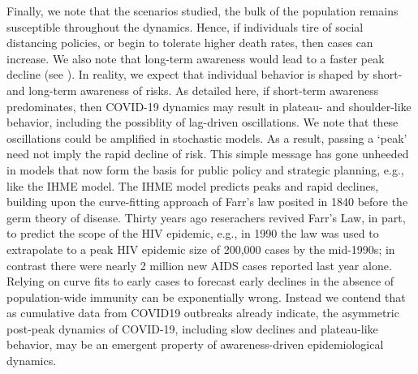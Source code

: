 
Finally, we note that the scenarios studied, the bulk of the population remains
susceptible throughout the dynamics. Hence, if individuals tire of social
distancing policies, or begin to tolerate higher death rates, then cases can
increase. We also note that long-term awareness would lead to a faster
peak decline (see \cite{eksin2019systematic}). In reality, we expect that individual
behavior is shaped by short- and long-term awareness of risks.  As detailed here,
if short-term awareness predominates, then COVID-19 dynamics may result
in plateau- and shoulder-like behavior, including the possiblity of 
lag-driven oscillations.  We note that these oscillations could be amplified 
in stochastic models.  As a result, passing a `peak' need not imply
the rapid decline of risk. This simple message has gone unheeded
in models that now form the basis for public policy
and strategic planning, e.g., like the IHME 
model. The IHME model predicts peaks and rapid declines, building upon 
the curve-fitting approach of Farr's law posited in 1840 before the
germ theory of disease.  Thirty years ago reserachers revived Farr's Law, in part, 
to predict the scope of the HIV epidemic, e.g., in 1990
the law was used to extrapolate to a peak HIV epidemic size of 200,000 cases by the 
mid-1990s\citep{bregman1990farr};
in contrast
there were nearly 2 million new AIDS cases reported last year alone. Relying
on curve fits to early cases to forecast
early declines in the absence of population-wide immunity can be exponentially wrong.
Instead we contend that as cumulative data from COVID19 outbreaks already
indicate, the asymmetric post-peak dynamics of COVID-19, including
slow declines and plateau-like behavior, may be an emergent
property of awareness-driven epidemiological dynamics.
